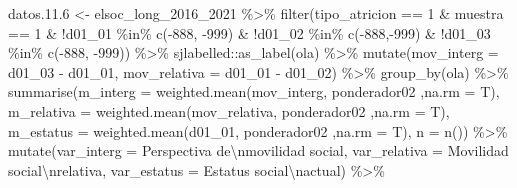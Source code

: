 \documentclass[
  12pt,
]{book}
\newenvironment{Shaded}{\begin{snugshade}}{\end{snugshade}}
\newcommand{\AttributeTok}[1]{\textcolor[rgb]{0.77,0.63,0.00}{#1}}
\newcommand{\DecValTok}[1]{\textcolor[rgb]{0.00,0.00,0.81}{#1}}
\newcommand{\FloatTok}[1]{\textcolor[rgb]{0.00,0.00,0.81}{#1}}
\newcommand{\FunctionTok}[1]{\textcolor[rgb]{0.00,0.00,0.00}{#1}}
\newcommand{\NormalTok}[1]{#1}
\newcommand{\OtherTok}[1]{\textcolor[rgb]{0.56,0.35,0.01}{#1}}
\newcommand{\SpecialCharTok}[1]{\textcolor[rgb]{0.00,0.00,0.00}{#1}}
\newcommand{\StringTok}[1]{\textcolor[rgb]{0.31,0.60,0.02}{#1}}
\begin{document}
\begin{Shaded}
\begin{Highlighting}[]
\NormalTok{datos.}\FloatTok{11.6} \OtherTok{\textless{}{-}}\NormalTok{ elsoc\_long\_2016\_2021 }\SpecialCharTok{\%\textgreater{}\%} 
  \FunctionTok{filter}\NormalTok{(tipo\_atricion }\SpecialCharTok{==} \DecValTok{1} \SpecialCharTok{\&}\NormalTok{ muestra }\SpecialCharTok{==} \DecValTok{1} \SpecialCharTok{\&} 
         \SpecialCharTok{!}\NormalTok{d01\_01 }\SpecialCharTok{\%in\%} \FunctionTok{c}\NormalTok{(}\SpecialCharTok{{-}}\DecValTok{888}\NormalTok{, }\SpecialCharTok{{-}}\DecValTok{999}\NormalTok{) }\SpecialCharTok{\&} \SpecialCharTok{!}\NormalTok{d01\_02 }\SpecialCharTok{\%in\%} \FunctionTok{c}\NormalTok{(}\SpecialCharTok{{-}}\DecValTok{888}\NormalTok{,}\SpecialCharTok{{-}}\DecValTok{999}\NormalTok{) }\SpecialCharTok{\&} \SpecialCharTok{!}\NormalTok{d01\_03 }\SpecialCharTok{\%in\%} \FunctionTok{c}\NormalTok{(}\SpecialCharTok{{-}}\DecValTok{888}\NormalTok{, }\SpecialCharTok{{-}}\DecValTok{999}\NormalTok{)) }\SpecialCharTok{\%\textgreater{}\%}
\NormalTok{  sjlabelled}\SpecialCharTok{::}\FunctionTok{as\_label}\NormalTok{(ola) }\SpecialCharTok{\%\textgreater{}\%} 
  \FunctionTok{mutate}\NormalTok{(}\AttributeTok{mov\_interg =}\NormalTok{ d01\_03 }\SpecialCharTok{{-}}\NormalTok{ d01\_01,}
         \AttributeTok{mov\_relativa =}\NormalTok{ d01\_01 }\SpecialCharTok{{-}}\NormalTok{ d01\_02) }\SpecialCharTok{\%\textgreater{}\%} 
  \FunctionTok{group\_by}\NormalTok{(ola) }\SpecialCharTok{\%\textgreater{}\%} 
  \FunctionTok{summarise}\NormalTok{(}\AttributeTok{m\_interg =} \FunctionTok{weighted.mean}\NormalTok{(mov\_interg, ponderador02 ,}\AttributeTok{na.rm =}\NormalTok{ T),}
            \AttributeTok{m\_relativa =} \FunctionTok{weighted.mean}\NormalTok{(mov\_relativa, ponderador02 ,}\AttributeTok{na.rm =}\NormalTok{ T),}
            \AttributeTok{m\_estatus =} \FunctionTok{weighted.mean}\NormalTok{(d01\_01, ponderador02 ,}\AttributeTok{na.rm =}\NormalTok{ T),}
            \AttributeTok{n =} \FunctionTok{n}\NormalTok{()) }\SpecialCharTok{\%\textgreater{}\%} 
  \FunctionTok{mutate}\NormalTok{(}\AttributeTok{var\_interg =} \StringTok{\textquotesingle{}Perspectiva de}\SpecialCharTok{\textbackslash{}n}\StringTok{movilidad social\textquotesingle{}}\NormalTok{,}
         \AttributeTok{var\_relativa =} \StringTok{\textquotesingle{}Movilidad social}\SpecialCharTok{\textbackslash{}n}\StringTok{relativa\textquotesingle{}}\NormalTok{,}
         \AttributeTok{var\_estatus =} \StringTok{\textquotesingle{}Estatus social}\SpecialCharTok{\textbackslash{}n}\StringTok{actual\textquotesingle{}}\NormalTok{) }\SpecialCharTok{\%\textgreater{}\%} 

\end{Highlighting}
\end{Shaded}
\end{document}
